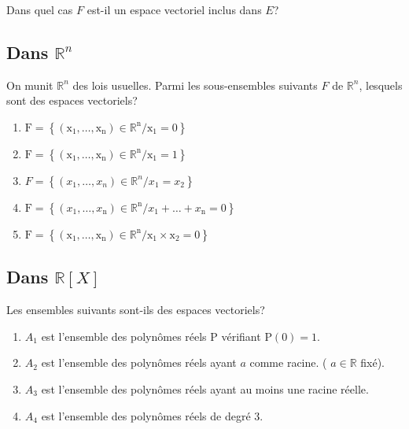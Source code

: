 Dans quel cas $F$ est-il un espace vectoriel inclus dans $E$?

\vspace{1em}

\subsection{Dans $\mathbb{R}^n$}

On munit $\mathbb{R}^n$ des lois usuelles. Parmi les sous-ensembles suivants $F$ de $\mathbb{R}^n$, lesquels sont des espaces vectoriels?

\begin{enumerate}
  \item $\mathrm{F}=\left\{\left(\mathrm{x}_1, \ldots, \mathrm{x}_{\mathrm{n}}\right) \in \mathbb{R}^{\mathrm{n}} / \mathrm{x}_1=0\right\}$
  \item $\mathrm{F}=\left\{\left(\mathrm{x}_1, \ldots, \mathrm{x}_{\mathrm{n}}\right) \in \mathbb{R}^{\mathrm{n}} / \mathrm{x}_1=1\right\}$
  \item $F=\left\{\left(x_1, \ldots, x_n\right) \in \mathbb{R}^n / x_1=x_2\right\}$
  \item $\mathrm{F}=\left\{\left(x_1, \ldots, x_{\mathrm{n}}\right) \in \mathbb{R}^{\mathrm{n}} / x_1+\ldots+x_{\mathrm{n}}=0\right\}$
  \item $\mathrm{F}=\left\{\left(\mathrm{x}_1, \ldots, \mathrm{x}_{\mathrm{n}}\right) \in \mathbb{R}^{\mathrm{n}} / \mathrm{x}_1 \times \mathrm{x}_2=0\right\}$
\end{enumerate}


\vspace{2em}

\subsection{Dans $\mathbb{R}[X]$}


Les ensembles suivants sont-ils des espaces vectoriels?
\begin{enumerate}
  \item $A_1$ est l'ensemble des polynômes réels P vérifiant $\mathrm{P}(0)=1$.
  \item $A_2$ est l'ensemble des polynômes réels ayant $a$ comme racine. ( $a \in \mathbb{R}$ fixé).
  \item $A_3$ est l'ensemble des polynômes réels ayant au moins une racine réelle.
  \item $A_4$ est l'ensemble des polynômes réels de degré 3.
\end{enumerate}

